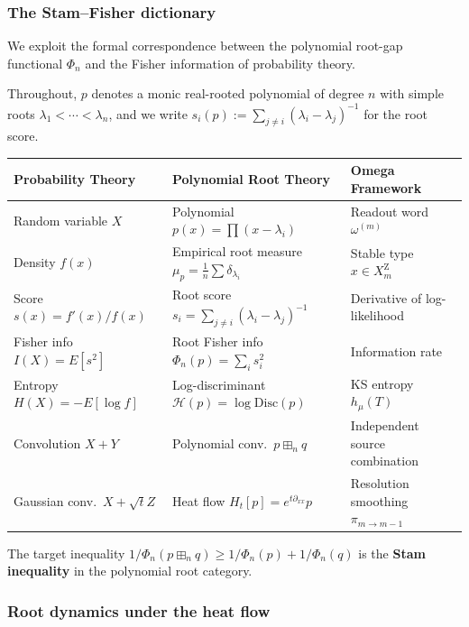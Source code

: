 \subsubsection{The Stam--Fisher dictionary}\label{sec:omega-q4}

We exploit the formal correspondence between the polynomial root-gap
functional $\Phi_n$ and the Fisher information of probability theory.

Throughout, $p$ denotes a monic real-rooted polynomial of degree $n$
with simple roots $\lambda_1<\cdots<\lambda_n$, and we write
$s_i(p):=\sum_{j\ne i}(\lambda_i-\lambda_j)^{-1}$ for the root score.

\begin{center}
\begin{tabular}{@{}lll@{}}
\toprule
\textbf{Probability Theory} & \textbf{Polynomial Root Theory} & \textbf{Omega Framework}\\
\midrule
Random variable $X$         & Polynomial $p(x)=\prod(x-\lambda_i)$    & Readout word $\omega^{(m)}$ \\
Density $f(x)$              & Empirical root measure $\mu_p=\frac1n\sum\delta_{\lambda_i}$ & Stable type $x\in X_m^{\mathrm Z}$ \\
Score $s(x)=f'(x)/f(x)$    & Root score $s_i=\sum_{j\ne i}(\lambda_i-\lambda_j)^{-1}$ & Derivative of log-likelihood \\
Fisher info $I(X)=E[s^2]$  & Root Fisher info $\Phi_n(p)=\sum_i s_i^2$ & Information rate \\
Entropy $H(X)=-E[\log f]$  & Log-discriminant $\mathcal H(p)=\log\mathrm{Disc}(p)$ & KS entropy $h_\mu(T)$ \\
Convolution $X+Y$           & Polynomial conv.\ $p\boxplus_n q$       & Independent source combination \\
Gaussian conv.\ $X+\sqrt{t}Z$& Heat flow $H_t[p]=e^{t\partial_{xx}}p$ & Resolution smoothing $\pi_{m\to m-1}$ \\
\bottomrule
\end{tabular}
\end{center}

\medskip
\noindent
The target inequality
$1/\Phi_n(p\boxplus_n q)\ge 1/\Phi_n(p)+1/\Phi_n(q)$
is the \textbf{Stam inequality} in the polynomial root category.

\subsubsection{Root dynamics under the heat flow}

